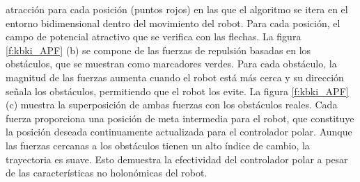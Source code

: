 atracción para cada posición (puntos rojos) en las que el algoritmo se itera en el entorno 
bidimensional dentro del movimiento del robot. Para cada posición, el campo de potencial 
atractivo que se verifica con las flechas. La figura \ref{f:kbki_APF} (b) se compone de las 
fuerzas de repulsión basadas en los obstáculos, que se muestran como marcadores verdes. Para 
cada obstáculo, la magnitud de las fuerzas aumenta cuando el robot está más cerca y su dirección 
señala los obstáculos, permitiendo que el robot los evite. La figura \ref{f:kbki_APF} (c) muestra 
la superposición de ambas fuerzas con los obstáculos reales. Cada fuerza proporciona una posición 
de meta intermedia para el robot, que constituye la posición deseada continuamente actualizada 
para el controlador polar. Aunque las fuerzas cercanas a los obstáculos tienen un alto índice 
de cambio, la trayectoria es suave. Esto demuestra la efectividad del controlador polar a pesar 
de las características no holonómicas del robot.


